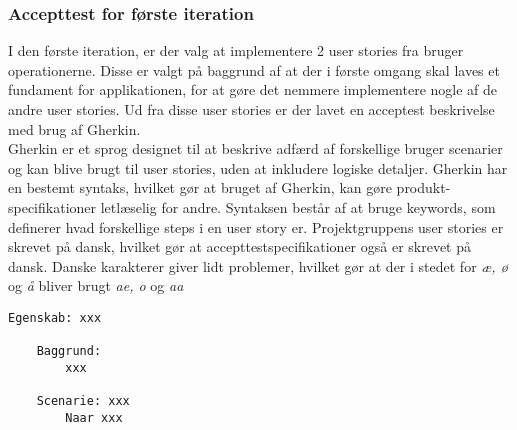 \subsubsection{Accepttest for første iteration}
\noindent I den første iteration, er der valg at implementere 2 user stories fra bruger operationerne. Disse er valgt på baggrund af at der i første omgang skal laves et fundament for applikationen, for at gøre det nemmere implementere nogle af de andre user stories. Ud fra disse user stories er der lavet en acceptest beskrivelse med brug af Gherkin\cite{gherkin}.\\
Gherkin er et sprog designet til at beskrive adfærd af forskellige bruger scenarier og kan blive brugt til user stories, uden at inkludere logiske detaljer. Gherkin har en bestemt syntaks, hvilket gør at bruget af Gherkin, kan gøre produkt-specifikationer letlæselig for andre. Syntaksen består af at bruge keywords, som definerer hvad forskellige steps i en user story er. Projektgruppens user stories er skrevet på dansk, hvilket gør at accepttestspecifikationer også er skrevet på dansk. Danske karakterer giver lidt problemer, hvilket gør at der i stedet for \textit{æ, ø} og \textit{å} bliver brugt \textit{ae, o} og \textit{aa} \newline 








\begin{lstlisting}[language=Gherkin]
Egenskab: xxx

    Baggrund:
        xxx
        
    Scenarie: xxx
        Naar xxx

\end{lstlisting}